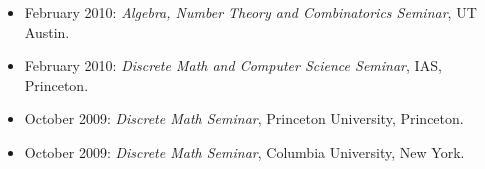 \documentclass[11pt]{article}
\newenvironment{mitemize}{
\begin{itemize}
  \setlength{\itemsep}{1pt}
  \setlength{\parskip}{0pt}
  \setlength{\parsep}{0pt}
}{\end{itemize}}
\begin{document}
\begin{mitemize}
\item February 2010: \emph{Algebra, Number Theory and Combinatorics Seminar}, UT Austin.
\item February 2010: \emph{Discrete Math and Computer Science Seminar}, IAS, Princeton.
\item October 2009: \emph{Discrete Math Seminar}, Princeton University, Princeton.
\item October 2009: \emph{Discrete Math Seminar}, Columbia University, New York.
\end{mitemize}
\end{document}
